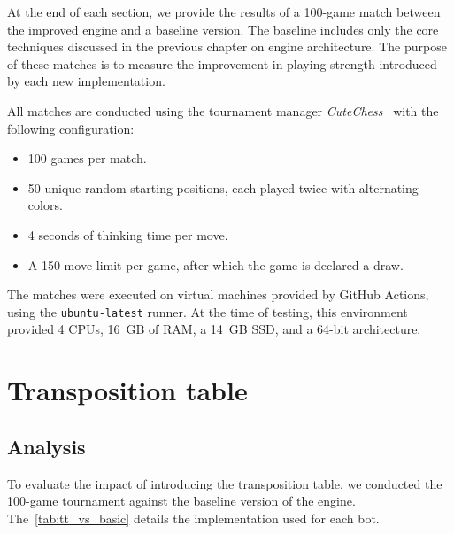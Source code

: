 \vspace{1em}

\noindent At the end of each section, we provide the results of a 100-game match between the improved engine and a baseline version. The baseline includes only the core techniques discussed in the previous chapter on engine architecture. The purpose of these matches is to measure the improvement in playing strength introduced by each new implementation.

\vspace{1em}

\noindent All matches are conducted using the tournament manager \textit{CuteChess}~\cite{CuteChess} with the following configuration:

\begin{itemize}[itemsep=1pt]
\item 100 games per match.
\item 50 unique random starting positions, each played twice with alternating colors.
\item 4 seconds of thinking time per move.
\item A 150-move limit per game, after which the game is declared a draw.
\end{itemize}

\noindent The matches were executed on virtual machines provided by GitHub Actions, using the \texttt{ubuntu-latest} runner. At the time of testing, this environment provided 4 CPUs, 16~GB of RAM, a 14~GB SSD, and a 64-bit architecture.

\section{Transposition table}\label{sec:tt}

\subsection*{Analysis}

\noindent To evaluate the impact of introducing the transposition table, we conducted the 100-game tournament against the baseline version of the engine. The~\cref{tab:tt_vs_basic} details the implementation used for each bot.

\vspace{1em}

